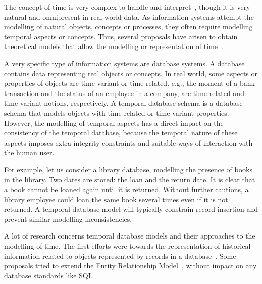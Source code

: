 %
%

The concept of time is very complex to handle and interpret~\cite{Klein1994,Shackle1961}, though it is very natural and omnipresent in real world data. As information systems attempt the modelling of natural objects, concepts or processes, they often require modelling temporal aspects or concepts. Thus, several proposals have arisen to obtain theoretical models that allow the modelling or representation of time~\cite{Bolour1982,VanderCruyssen1997}.

A very specific type of information systems are database systems. A database contains data representing real objects or concepts. In real world, some aspects or properties of objects are time-variant or time-related. e.g., the moment of a bank transaction and the status of an employee in a company, are time-related and time-variant notions, respectively.
A temporal database schema is a database schema that models objects with time-related or time-variant properties. However, the modelling of temporal aspects has a direct impact on the consistency of the temporal database, because the temporal nature of these aspects imposes extra integrity constraints and suitable ways of interaction with the human user. 


For example, let us consider a library database, modelling the presence of books in the library. Two dates are stored: the loan and the return date. It is clear that a book cannot be loaned again until it is returned. Without further cautions, a library employee could loan the same book several times even if it is not returned. A temporal database model will typically constrain record insertion and prevent similar modelling inconsistencies.

A lot of research concerns temporal database models and their approaches to the modelling of time. The first efforts were towards the representation of historical information related to objects represented by records in a database~\cite{Clifford1985}. Some proposals tried to extend the Entity Relationship Model~\cite{Klopprogge1983}, without impact on any database standards like SQL~\cite{Sarda1990}.

